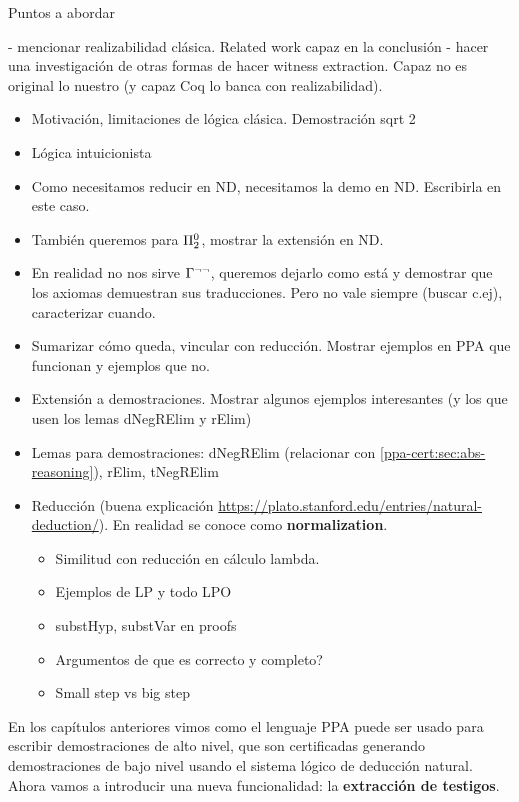Puntos a abordar

- mencionar realizabilidad clásica. Related work capaz en la conclusión
- hacer una investigación de otras formas de hacer witness extraction. Capaz no es original lo nuestro (y capaz Coq lo banca con realizabilidad).

\begin{itemize}
    \item Motivación, limitaciones de lógica clásica. Demostración sqrt 2
    \item Lógica intuicionista
    \item Como necesitamos reducir en ND, necesitamos la demo en ND. Escribirla
    en este caso.
    \item También queremos para $\Pi^0_{2}$, mostrar la extensión en ND.
    \item En realidad no nos sirve $\Gamma^{\neg\neg}$, queremos dejarlo como
    está y demostrar que los axiomas demuestran sus traducciones. Pero no vale
    siempre (buscar c.ej), caracterizar cuando.
    \item Sumarizar cómo queda, vincular con reducción. Mostrar ejemplos en PPA
    que funcionan y ejemplos que no.
    \item Extensión a demostraciones. Mostrar algunos ejemplos interesantes (y
    los que usen los lemas dNegRElim y rElim)
    \item Lemas para demostraciones: dNegRElim (relacionar con \ref{ppa-cert:sec:abs-reasoning}), rElim, tNegRElim
    \item Reducción (buena explicación
    \url{https://plato.stanford.edu/entries/natural-deduction/}). En realidad se
    conoce como \textbf{normalization}.
    \begin{itemize}
        \item Similitud con reducción en cálculo lambda.
        \item Ejemplos de LP y todo LPO
        \item substHyp, substVar en proofs
        \item Argumentos de que es correcto y completo?
        \item Small step vs big step
    \end{itemize}
\end{itemize}

\newpage

En los capítulos anteriores vimos como el lenguaje PPA puede ser usado para
escribir demostraciones de alto nivel, que son certificadas generando
demostraciones de bajo nivel usando el sistema lógico de deducción natural.
Ahora vamos a introducir una nueva funcionalidad: la \textbf{extracción de testigos}.

